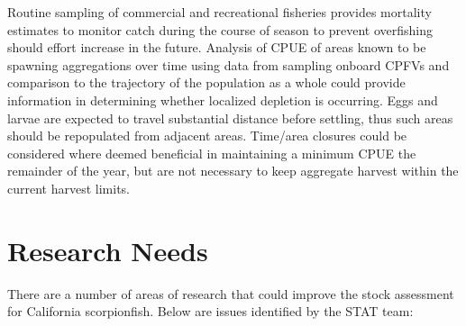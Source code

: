 \documentclass[12pt,]{article}
\begin{document}
Routine sampling of commercial and recreational fisheries provides
mortality estimates to monitor catch during the course of season to
prevent overfishing should effort increase in the future. Analysis of
CPUE of areas known to be spawning aggregations over time using data
from sampling onboard CPFVs and comparison to the trajectory of the
population as a whole could provide information in determining whether
localized depletion is occurring. Eggs and larvae are expected to travel
substantial distance before settling, thus such areas should be
repopulated from adjacent areas. Time/area closures could be considered
where deemed beneficial in maintaining a minimum CPUE the remainder of
the year, but are not necessary to keep aggregate harvest within the
current harvest limits.

\section{Research Needs}\label{research-needs}

There are a number of areas of research that could improve the stock
assessment for California scorpionfish. Below are issues identified by
the STAT team:
\end{document}
